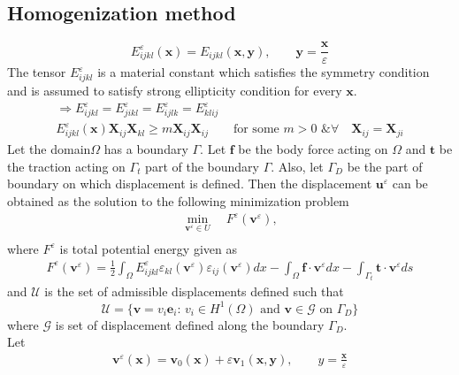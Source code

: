 \documentclass[10pt]{article}
\begin{document}
\subsection{Homogenization method}
\begin{equation}
E_{ijkl}^\varepsilon (\textbf{x}) = E_{ijkl}(\textbf{x},\textbf{y}), \qquad \textbf{y} = \frac{\textbf{x}}{\varepsilon}
\end{equation}
The tensor $E_{ijkl}^\varepsilon$ is a material constant which satisfies the symmetry condition and is assumed to satisfy strong ellipticity condition for every $\textbf{x}$.
\begin{gather}
\Rightarrow E_{ijkl}^\varepsilon =E_{jikl}^\varepsilon =E_{ijlk}^\varepsilon =E_{klij}^\varepsilon\\
E_{ijkl}^\varepsilon(\textbf{x})\textbf{X}_{ij}\textbf{X}_{kl}\geq m\textbf{X}_{ij}\textbf{X}_{ij} \qquad \text{for some } m>0 \text{ \& } \forall \quad \textbf{X}_{ij}=\textbf{X}_{ji}
\end{gather}
Let the domain$\Omega$ has a boundary $\Gamma$. Let $\textbf{f}$ be the body force acting on $\Omega$ and $\textbf{t}$ be the traction acting on $\Gamma_t$ part of the boundary $\Gamma$. Also, let $\Gamma_D$ be the part of boundary on which displacement is defined. Then the displacement $\textbf{u}^\varepsilon$ can be obtained as the solution to the following minimization problem
\begin{align}
\label{fem}
\min_{\textbf{v}^\varepsilon\in U} \quad F^\varepsilon(\textbf{v}^\varepsilon),\\
\end{align} 
where $F^\varepsilon$ is total potential energy given as	
\begin{eqnarray}
F^\varepsilon(\textbf{v}^\varepsilon) = \frac{1}{2}\int_\Omega E^\varepsilon_{ijkl}\varepsilon_{kl}(\textbf{v}^\varepsilon)\varepsilon_{ij}(\textbf{v}^\varepsilon)dx-\int_\Omega\textbf{f}\cdot\textbf{v}^\varepsilon dx - \int_{\Gamma_t}\textbf{t}\cdot\textbf{v}^\varepsilon ds
\end{eqnarray}
and $\mathcal{U}$ is the set of admissible displacements defined such that
\begin{equation}
\mathcal{U} = \{\textbf{v} = v_i\textbf{e}_i :\, v_i\in H^1(\Omega) \text{ and } \textbf{v}\in\mathcal{G} \text{ on } \Gamma_D\}
\end{equation}
where $\mathcal{G}$ is set of displacement defined along the boundary $\Gamma_D$.\\
Let 
\begin{align}
\textbf{v}^\varepsilon(\textbf{x}) = \textbf{v}_0(\textbf{x})+\varepsilon\textbf{v}_1(\textbf{x},\textbf{y}),\qquad y=\frac{\textbf{x}}{\varepsilon}
\end{align}
\end{document}
